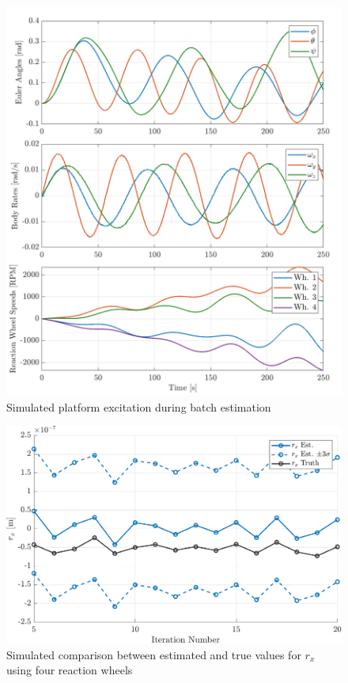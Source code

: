 \begin{figure}[p]
    \centering
    \includegraphics[width=\linewidth]{plots/LSR_sim_excitation}
    \caption{Simulated platform excitation during batch estimation}
    \label{fig:LSR_sim_excitation}
\end{figure}

\begin{figure}[p]
    \centering
    \includegraphics[width=\linewidth]{plots/LSR_sim_confidence.pdf}
    \caption{Simulated comparison between estimated and true values for $r_x$ using four reaction wheels}
    \label{fig:LSR_sim_confidence}
\end{figure}

